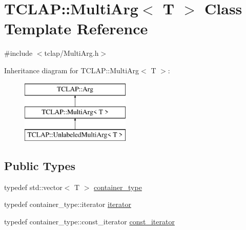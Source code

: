 \hypertarget{class_t_c_l_a_p_1_1_multi_arg}{}\section{T\+C\+L\+A\+P\+:\+:Multi\+Arg$<$ T $>$ Class Template Reference}
\label{class_t_c_l_a_p_1_1_multi_arg}


{\ttfamily \#include $<$tclap/\+Multi\+Arg.\+h$>$}

Inheritance diagram for T\+C\+L\+A\+P\+:\+:Multi\+Arg$<$ T $>$\+:\begin{figure}[H]
\begin{center}
\leavevmode
\includegraphics[height=3.000000cm]{class_t_c_l_a_p_1_1_multi_arg}
\end{center}
\end{figure}
\subsection*{Public Types}
\begin{DoxyCompactItemize}
\item 
typedef std\+::vector$<$ T $>$ \hyperlink{class_t_c_l_a_p_1_1_multi_arg_adae435f03fdde769bca57327487aab78}{container\+\_\+type}
\item 
typedef container\+\_\+type\+::iterator \hyperlink{class_t_c_l_a_p_1_1_multi_arg_a34196784baca2bd5aa079d639d49a7ca}{iterator}
\item 
typedef container\+\_\+type\+::const\+\_\+iterator \hyperlink{class_t_c_l_a_p_1_1_multi_arg_a3f8e9e8f5dcc7d3e6a518f42134cf64f}{const\+\_\+iterator}
\end{DoxyCompactItemize}
